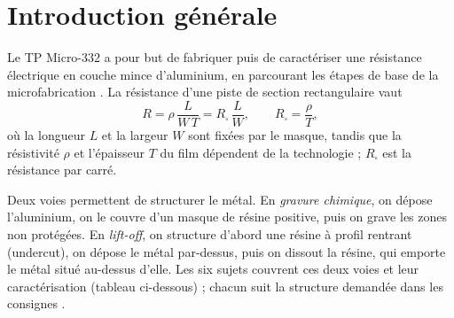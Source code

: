 \section*{Introduction générale}
{}

Le TP Micro-332 a pour but de fabriquer puis de caractériser une résistance électrique en couche mince d'aluminium, en parcourant les étapes de base de la microfabrication \cite{intro}. La résistance d'une piste de section rectangulaire vaut
\begin{equation}
  R = \rho\,\frac{L}{W\,T} = R_\square\,\frac{L}{W},
  \qquad R_\square = \frac{\rho}{T},
  \label{eq:resistance}
\end{equation}
où la longueur $L$ et la largeur $W$ sont fixées par le masque, tandis que la résistivité $\rho$ et l'épaisseur $T$ du film dépendent de la technologie ; $R_\square$ est la résistance par carré.

Deux voies permettent de structurer le métal. En \emph{gravure chimique}, on dépose l'aluminium, on le couvre d'un masque de résine positive, puis on grave les zones non protégées. En \emph{lift-off}, on structure d'abord une résine à profil rentrant (undercut), on dépose le métal par-dessus, puis on dissout la résine, qui emporte le métal situé au-dessus d'elle. Les six sujets couvrent ces deux voies et leur caractérisation (tableau ci-dessous) ; chacun suit la structure demandée dans les consignes \cite{consignes}.

